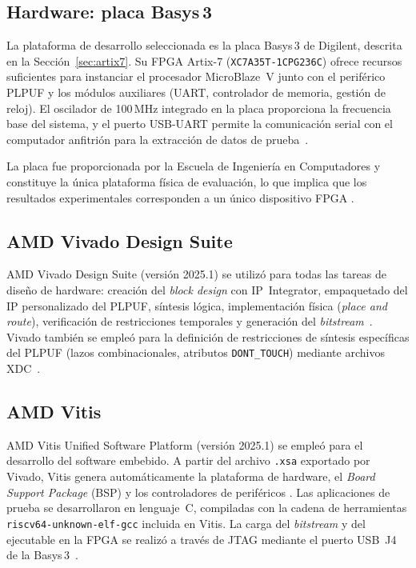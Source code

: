 \subsection{Hardware: placa Basys\,3}
\label{sec:hw_basys3}

La plataforma de desarrollo seleccionada es la placa Basys\,3 de Digilent,
descrita en la Sección~\ref{sec:artix7}. Su FPGA Artix-7
(\texttt{XC7A35T-1CPG236C}) ofrece recursos suficientes para instanciar el
procesador MicroBlaze~V junto con el periférico PLPUF y los módulos
auxiliares (UART, controlador de memoria, gestión de reloj). El oscilador de
100\,MHz integrado en la placa proporciona la frecuencia base del sistema, y
el puerto USB-UART permite la comunicación serial con el computador anfitrión
para la extracción de datos de prueba~\cite{basys3rm}.

La placa fue proporcionada por la Escuela de Ingeniería en Computadores y
constituye la única plataforma física de evaluación, lo que implica que los
resultados experimentales corresponden a un único dispositivo FPGA
\cite{wilde_2020_confidence}.

\subsection{AMD Vivado Design Suite}
\label{sec:hw_vivado}

AMD Vivado Design Suite (versión 2025.1) se utilizó para
todas las tareas de diseño de hardware: creación del \textit{block design}
con IP~Integrator, empaquetado del IP personalizado del PLPUF, síntesis
lógica, implementación física (\textit{place and route}), verificación de
restricciones temporales y generación del \textit{bitstream}~\cite{ug994}.
Vivado también se empleó para la definición de restricciones de síntesis
específicas del PLPUF (lazos combinacionales, atributos \texttt{DONT\_TOUCH})
mediante archivos XDC~\cite{ug1037}.

\subsection{AMD Vitis}
\label{sec:hw_vitis}

AMD Vitis Unified Software Platform (versión 2025.1) se empleó para el
desarrollo del software embebido. A partir del archivo \texttt{.xsa}
exportado por Vivado, Vitis genera automáticamente la plataforma de hardware,
el \textit{Board Support Package} (BSP) y los controladores de periféricos
\cite{ug1701}. Las aplicaciones de prueba se desarrollaron en lenguaje~C,
compiladas con la cadena de herramientas \texttt{riscv64-unknown-elf-gcc}
incluida en Vitis. La carga del \textit{bitstream} y del ejecutable en la
FPGA se realizó a través de JTAG mediante el puerto USB~J4 de la
Basys\,3~\cite{ug1701}.

